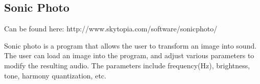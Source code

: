 \subsection{Sonic Photo}\label{sub:sonic}
Can be found here: http://www.skytopia.com/software/sonicphoto/

Sonic photo is a program that allows the user to transform an image into sound. The user can load an image into the program, and adjust various parameters to modify the resulting audio. The parameters include  frequency(Hz), brightness, tone, harmony quantization, etc.

